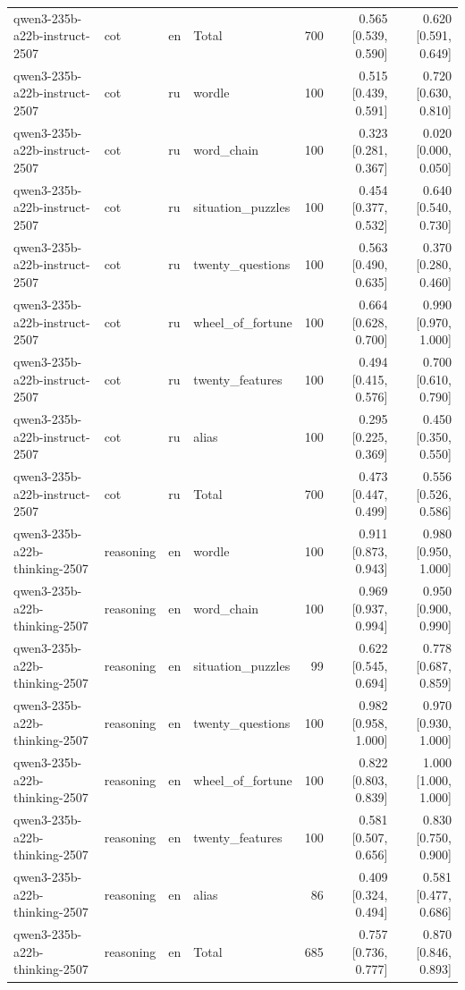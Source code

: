 \begin{longtable}{llllrrr}
qwen3-235b-a22b-instruct-2507 & cot & en & Total & 700 & 0.565 [0.539, 0.590] & 0.620 [0.591, 0.649] \\
qwen3-235b-a22b-instruct-2507 & cot & ru & wordle & 100 & 0.515 [0.439, 0.591] & 0.720 [0.630, 0.810] \\
qwen3-235b-a22b-instruct-2507 & cot & ru & word\_chain & 100 & 0.323 [0.281, 0.367] & 0.020 [0.000, 0.050] \\
qwen3-235b-a22b-instruct-2507 & cot & ru & situation\_puzzles & 100 & 0.454 [0.377, 0.532] & 0.640 [0.540, 0.730] \\
qwen3-235b-a22b-instruct-2507 & cot & ru & twenty\_questions & 100 & 0.563 [0.490, 0.635] & 0.370 [0.280, 0.460] \\
qwen3-235b-a22b-instruct-2507 & cot & ru & wheel\_of\_fortune & 100 & 0.664 [0.628, 0.700] & 0.990 [0.970, 1.000] \\
qwen3-235b-a22b-instruct-2507 & cot & ru & twenty\_features & 100 & 0.494 [0.415, 0.576] & 0.700 [0.610, 0.790] \\
qwen3-235b-a22b-instruct-2507 & cot & ru & alias & 100 & 0.295 [0.225, 0.369] & 0.450 [0.350, 0.550] \\
qwen3-235b-a22b-instruct-2507 & cot & ru & Total & 700 & 0.473 [0.447, 0.499] & 0.556 [0.526, 0.586] \\
qwen3-235b-a22b-thinking-2507 & reasoning & en & wordle & 100 & 0.911 [0.873, 0.943] & 0.980 [0.950, 1.000] \\
qwen3-235b-a22b-thinking-2507 & reasoning & en & word\_chain & 100 & 0.969 [0.937, 0.994] & 0.950 [0.900, 0.990] \\
qwen3-235b-a22b-thinking-2507 & reasoning & en & situation\_puzzles & 99 & 0.622 [0.545, 0.694] & 0.778 [0.687, 0.859] \\
qwen3-235b-a22b-thinking-2507 & reasoning & en & twenty\_questions & 100 & 0.982 [0.958, 1.000] & 0.970 [0.930, 1.000] \\
qwen3-235b-a22b-thinking-2507 & reasoning & en & wheel\_of\_fortune & 100 & 0.822 [0.803, 0.839] & 1.000 [1.000, 1.000] \\
qwen3-235b-a22b-thinking-2507 & reasoning & en & twenty\_features & 100 & 0.581 [0.507, 0.656] & 0.830 [0.750, 0.900] \\
qwen3-235b-a22b-thinking-2507 & reasoning & en & alias & 86 & 0.409 [0.324, 0.494] & 0.581 [0.477, 0.686] \\
qwen3-235b-a22b-thinking-2507 & reasoning & en & Total & 685 & 0.757 [0.736, 0.777] & 0.870 [0.846, 0.893] \\

\end{longtable}
